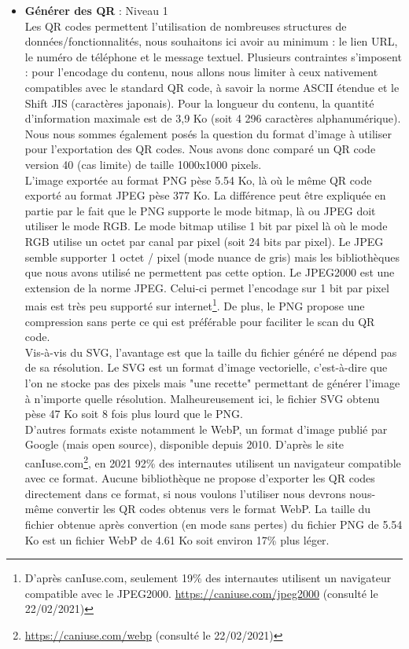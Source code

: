 \documentclass[a4paper,12pt]{article}
\begin{document}
\begin{itemize}
  \item \textbf{Générer des QR} : Niveau 1\\
  \label{GenQRCode}
  Les QR codes permettent l'utilisation de nombreuses structures de données/fonctionnalités, nous souhaitons ici avoir au minimum : le lien URL, le numéro de téléphone et le message textuel. Plusieurs contraintes s'imposent : pour l'encodage du contenu, nous allons nous limiter à ceux nativement compatibles avec le standard QR code, à savoir la norme ASCII étendue et le Shift JIS (caractères japonais). Pour la longueur du contenu, la quantité d'information maximale est de 3,9 Ko (soit 4 296 caractères alphanumérique).\\
  Nous nous sommes également posés la question du format d'image à utiliser pour l'exportation des QR codes. Nous avons donc comparé un QR code version 40 (cas limite) de taille 1000x1000 pixels.\\
  L'image exportée au format PNG pèse 5.54 Ko, là où le même QR code exporté au format JPEG pèse 377 Ko. La différence peut être expliquée en partie par le fait que le PNG supporte le mode bitmap, là ou JPEG doit utiliser le mode RGB. Le mode bitmap utilise 1 bit par pixel là où le mode RGB utilise un octet par canal par pixel (soit 24 bits par pixel). Le JPEG semble supporter 1 octet / pixel (mode nuance de gris) mais les bibliothèques que nous avons utilisé ne permettent pas cette option. Le JPEG2000 est une extension de la norme JPEG. Celui-ci permet l'encodage sur 1 bit par pixel mais est très peu supporté sur internet\footnote{D'après canIuse.com, seulement 19\% des internautes utilisent un navigateur compatible avec le JPEG2000. \url{https://caniuse.com/jpeg2000} (consulté le 22/02/2021)}. De plus, le PNG propose une compression sans perte ce qui est préférable pour faciliter le scan du QR code.\\
  Vis-à-vis du SVG, l'avantage est que la taille du fichier généré ne dépend pas de sa résolution. Le SVG est un format d'image vectorielle, c'est-à-dire que l'on ne stocke pas des pixels mais "une recette" permettant de générer l'image à n'importe quelle résolution. Malheureusement ici, le fichier SVG obtenu pèse 47 Ko soit 8 fois plus lourd que le PNG.\\
  D'autres formats existe notamment le WebP, un format d'image publié par Google (mais open source), disponible depuis 2010. D'après le site canIuse.com\footnote{\url{https://caniuse.com/webp} (consulté le 22/02/2021)}, en 2021 92\% des internautes utilisent un navigateur compatible avec ce format. Aucune bibliothèque ne propose d'exporter les QR codes directement dans ce format, si nous voulons l'utiliser nous devrons nous-même convertir les QR codes obtenus vers le format WebP. La taille du fichier obtenue après convertion (en mode sans pertes) du fichier PNG de 5.54 Ko est un fichier WebP de 4.61 Ko soit environ 17\% plus léger.\\

\end{itemize}
\end{document}
